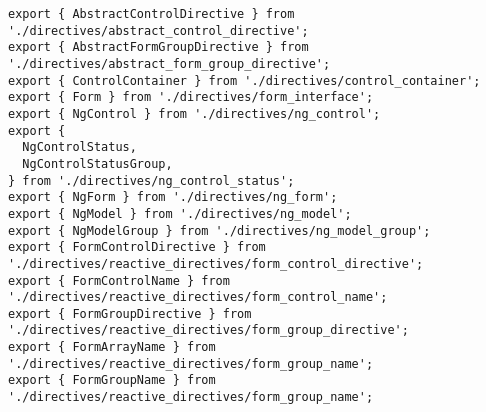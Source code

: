 \begin{verbatim}
export { AbstractControlDirective } from './directives/abstract_control_directive';
export { AbstractFormGroupDirective } from './directives/abstract_form_group_directive';
export { ControlContainer } from './directives/control_container';
export { Form } from './directives/form_interface';
export { NgControl } from './directives/ng_control';
export {
  NgControlStatus,
  NgControlStatusGroup,
} from './directives/ng_control_status';
export { NgForm } from './directives/ng_form';
export { NgModel } from './directives/ng_model';
export { NgModelGroup } from './directives/ng_model_group';
export { FormControlDirective } from './directives/reactive_directives/form_control_directive';
export { FormControlName } from './directives/reactive_directives/form_control_name';
export { FormGroupDirective } from './directives/reactive_directives/form_group_directive';
export { FormArrayName } from './directives/reactive_directives/form_group_name';
export { FormGroupName } from './directives/reactive_directives/form_group_name';
\end{verbatim}
